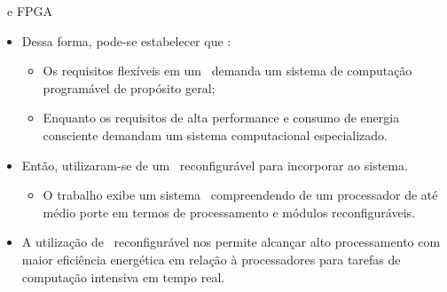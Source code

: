    \begin{frame}{\Wearable\ e FPGA} \vspace{-1em}
      \begin{itemize}
         \setlength{\itemsep}{1.6em}
         \item Dessa forma, pode-se estabelecer que \cite{Plessl2003}:
         \begin{itemize}
            \setlength{\itemsep}{0.8em}
            \item Os requisitos flexíveis em um \wearable\ demanda um sistema de computação programável de propósito geral;
            \item Enquanto os requisitos de alta performance e consumo de energia consciente demandam um sistema computacional especializado. 
         \end{itemize}
      
         \item Então, utilizaram-se de um \hardware\ reconfigurável para incorporar ao sistema. 
         \begin{itemize}
            \item O trabalho exibe um sistema \wearables\ compreendendo de um processador de até médio porte em termos de processamento e módulos reconfiguráveis.
            
         \end{itemize}
         \item A utilização de \hardware\ reconfigurável nos permite alcançar alto processamento com maior eficiência energética em relação à processadores para tarefas de computação intensiva em tempo real.
      \end{itemize}
   \end{frame}
